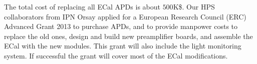The total cost of replacing all ECal APDs is about $500$K\$. Our HPS collaborators from IPN Orsay applied for a European Research Council (ERC) Advanced Grant 2013 to purchase APDs, and to provide manpower costs to replace the old ones, design and build new preamplifier boards, and assemble the ECal with the new modules. This grant will also include the light monitoring system. If successful the grant will cover most of the ECal modifications. 
